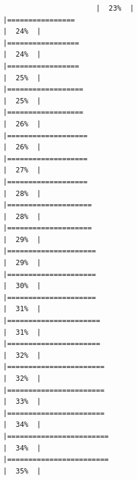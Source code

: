 \documentclass[
  ignorenonframetext,
]{beamer}
\begin{document}
\begin{frame}[fragile]{}
\begin{verbatim}
                      |  23%  |                                                                              |================                                                      |  24%  |                                                                              |=================                                                     |  24%  |                                                                              |=================                                                     |  25%  |                                                                              |==================                                                    |  25%  |                                                                              |==================                                                    |  26%  |                                                                              |===================                                                   |  26%  |                                                                              |===================                                                   |  27%  |                                                                              |===================                                                   |  28%  |                                                                              |====================                                                  |  28%  |                                                                              |====================                                                  |  29%  |                                                                              |=====================                                                 |  29%  |                                                                              |=====================                                                 |  30%  |                                                                              |=====================                                                 |  31%  |                                                                              |======================                                                |  31%  |                                                                              |======================                                                |  32%  |                                                                              |=======================                                               |  32%  |                                                                              |=======================                                               |  33%  |                                                                              |=======================                                               |  34%  |                                                                              |========================                                              |  34%  |                                                                              |========================                                              |  35%  |                                                                              
\end{verbatim}
\end{frame}
\end{document}
